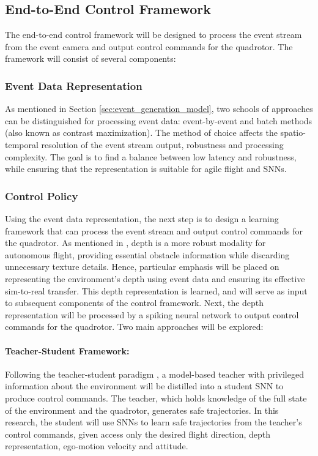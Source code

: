\documentclass{article}
\begin{document}
\subsection{End-to-End Control Framework}
The end-to-end control framework will be designed to process the event stream from the event camera and output control commands for the quadrotor. The framework will consist of several components:

\subsubsection{Event Data Representation}
As mentioned in Section \ref{sec:event_generation_model}, two schools of approaches can be distinguished for processing event data: event-by-event and batch methods (also known as contrast maximization). The method of choice affects the spatio-temporal resolution of the event stream output, robustness and processing complexity. The goal is to find a balance between low latency and robustness, while ensuring that the representation is suitable for agile flight and SNNs. 

\subsubsection{Control Policy}
Using the event data representation, the next step is to design a learning framework that can process the event stream and output control commands for the quadrotor. As mentioned in \cite{bhattacharyaMonocularEventBasedVision2024, loquercioLearningHighSpeedFlight2021}, depth is a more robust modality for autonomous flight, providing essential obstacle information while discarding unnecessary texture details. Hence, particular emphasis will be placed on representing the environment's depth using event data and ensuring its effective sim-to-real transfer. This depth representation is learned, and will serve as input to subsequent components of the control framework. Next, the depth representation will be processed by a spiking neural network to output control commands for the quadrotor. Two main approaches will be explored:

\paragraph{Teacher-Student Framework:} Following the teacher-student paradigm \cite{loquercioLearningHighSpeedFlight2021, bhattacharyaMonocularEventBasedVision2024}, a model-based teacher with privileged information about the environment will be distilled into a student SNN to produce control commands. The teacher, which holds knowledge of the full state of the environment and the quadrotor, generates safe trajectories. In this research, the student will use SNNs to learn safe trajectories from the teacher's control commands, given access only the desired flight direction, depth representation, ego-motion velocity and attitude.
    
\end{document}
